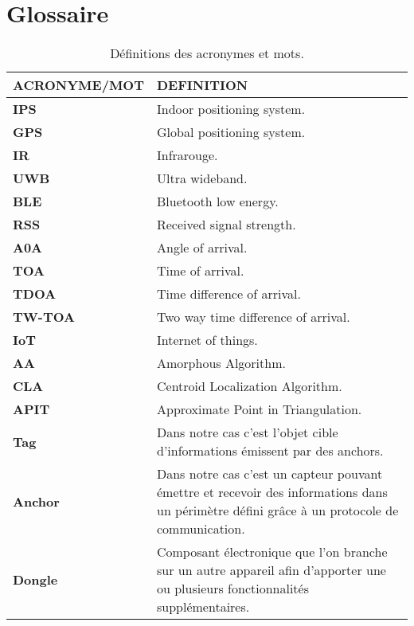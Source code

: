 \section{Glossaire}

\begin{table}[H]
	\centering
	\begin{tabular}{|p{4cm}|p{10cm}|}
		\hline
		\cellcolor[HTML]{C0C0C0}\textbf{ACRONYME/MOT} & \cellcolor[HTML]{C0C0C0}\textbf{DEFINITION} 
		\\ \hline
		
		\textbf{IPS } & Indoor positioning system. \\ \hline
		\textbf{GPS } & Global positioning system. \\ \hline
		\textbf{IR } & Infrarouge. \\ \hline
		\textbf{UWB } & Ultra wideband. \\ \hline
		\textbf{BLE } & Bluetooth low energy. \\ \hline
		\textbf{RSS } & Received signal strength. \\ \hline
		\textbf{A0A } & Angle of arrival. \\ \hline
		\textbf{TOA } & Time of arrival. \\ \hline
		\textbf{TDOA } & Time difference of arrival. \\ \hline
		\textbf{TW-TOA } & Two way time difference of arrival. \\ \hline
		\textbf{IoT } & Internet of things. \\ \hline
		\textbf{AA } & Amorphous Algorithm. \\ \hline
		\textbf{CLA } & Centroid Localization Algorithm. \\ \hline
		\textbf{APIT} & Approximate Point in Triangulation. \\ \hline
		\textbf{Tag} & Dans notre cas c'est l'objet cible d'informations émissent par des anchors.\\ \hline
		\textbf{Anchor} & Dans notre cas c'est un capteur pouvant émettre et recevoir des informations dans un périmètre défini grâce à un protocole de communication. \\ \hline
		\textbf{Dongle} & Composant électronique que l'on branche sur un autre appareil afin d'apporter une ou plusieurs fonctionnalités supplémentaires. \\ \hline

	\end{tabular}
	\caption{Définitions des acronymes et mots.}
\end{table}